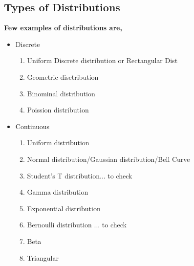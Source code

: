 \documentclass{beamer}
\begin{document}
\subsection{Types of Distributions} 
\begin{frame}%
	\textbf{Few examples of distributions are,}
	\begin{itemize}
		\item Discrete
			\begin{enumerate}
			\item Uniform Discrete distribution or Rectangular Dist
			\item Geometric disctribution
			\item Binominal distribution
			\item Poission distribution
		\end{enumerate}
		\item Continuous
			\begin{enumerate}
			\item Uniform distribution
			\item Normal distribution/Gaussian distribution/Bell Curve
			\item Student’s T distribution... to check
			\item Gamma distribution
			\item Exponential distribution
			\item Bernoulli distribution ... to check
			\item Beta
			\item Triangular
		\end{enumerate}
		
	\end{itemize}

\end{frame}
\end{document}
